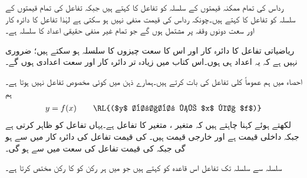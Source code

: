 رداس کی تمام ممکنہ قیمتوں کے سلسلہ کو تفاعل کا  کہتے ہیں جبکہ تفاعل کی تمام قیمتوں کے سلسلہ کو تفاعل کا  کہتے ہیں۔چونکہ رداس کی قیمت منفی نہیں ہو سکتی ہے لہٰذا تفاعل کا دائرہ کار اور سعت دونوں وقفہ \عددی{[0,\infty)} پر مشتمل ہوں گے جو تمام غیر منفی حقیقی اعداد کا سلسلہ ہے۔

ریاضیاتی تفاعل کا دائرہ کار اور اس کا سعت چیزوں کا سلسلہ ہو سکتے ہیں؛ ضروری نہیں ہے کہ یہ اعداد ہی ہوں۔اس کتاب میں زیادہ تر دائرہ کار اور سعت اعدادی ہوں گے۔

احصاء میں ہم عموماً کلی تفاعل کی بات کرتے ہیں۔ہمارے ذہن میں کوئی مخصوص تفاعل نہیں ہوتا ہے۔ہم
\begin{align*}
y=f(x)\quad \quad \text{\RL{($y$ برابر ہے $x$ کا $f$)}}
\end{align*}
لکھتے ہوئے کہنا چاہتے ہیں کہ متغیر ، متغیر   کا تفاعل  ہے۔یہاں  تفاعل کو ظاہر کرتی ہے جبکہ داخلی قیمت   ہے اور خارجی قیمت   ہیں۔ کی قیمت تفاعل کی دائرہ کار میں سے ہو گی جبکہ  کی قیمت تفاعل کی سعت میں سے ہو گی۔ 

سلسلہ  سے سلسلہ  تک تفاعل  اس قاعدہ کو کہتے ہیں جو  میں ہر رکن  کو  کا  رکن  مختص کرتا ہے۔

